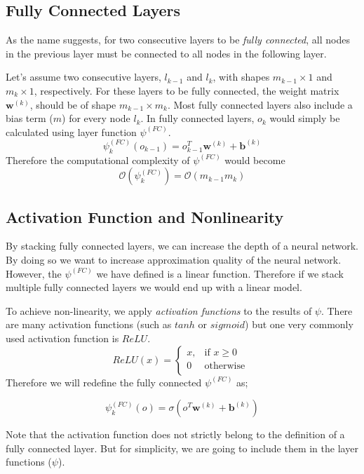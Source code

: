 \subsection{Fully Connected Layers}
As the name suggests, for two consecutive layers to be \textit{fully connected}, all nodes in the previous layer must be connected to all nodes in the following layer. 

Let's assume two consecutive layers, $l_{k-1}$ and $l_{k}$, with shapes $m_{k-1} \times 1$ and $m_k \times 1$, respectively. For these layers to be fully connected, the weight matrix $\mathbf{w}^{(k)}$, should be of shape $m_{k-1} \times m_{k}$. Most fully connected layers also include a bias term ($m$) for every node $l_k$. In fully connected layers, $o_k$ would simply be calculated using layer function $\psi^{(FC)}$.
$$ \psi^{(FC)}_k(o_{k-1}) = o_{k-1}^T\mathbf{w}^{(k)} + \mathbf{b}^{(k)}$$
Therefore the computational complexity of $\psi^{(FC)}$ would become
$$\mathcal{O}(\psi^{(FC)}_k) = \mathcal{O}(m_{k-1}m_{k})$$

\subsection{Activation Function and Nonlinearity}
By stacking fully connected layers, we can increase the depth of a neural network. By doing so we want to increase approximation quality of the neural network. However, the $\psi^{(FC)}$ we have defined is a linear function. Therefore if we stack multiple fully connected layers we would end up with a linear model. 

To achieve non-linearity, we apply \textit{activation functions} to the results of $\psi$. There are many activation functions (such as $tanh$ or $sigmoid$) but one very commonly used activation function is $ReLU$.  
\begin{equation}
\label{eq:relu_definition}
    ReLU(x) = 
\begin{cases}
    x, & \text{if }x \geq 0\\
    0 &  \text{otherwise }\\
\end{cases}
\end{equation}
Therefore we will redefine the fully connected $\psi^{(FC)}$ as;

$$ \psi^{(FC)}_k(o) = \sigma(o^T\mathbf{w}^{(k)} + \mathbf{b}^{(k)})$$

Note that the activation function does not strictly belong to the definition of a fully connected layer. But for simplicity, we are going to include them in the layer functions ($\psi$).

